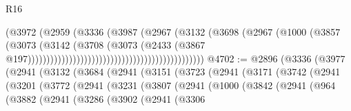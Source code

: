 \begin{lexlean}{R16}
\begin{coremodule}
                                                                  (@3972
                                                                    (@2959
                                                                      (@3336
                                                                        (@3987
                                                                          (@2967
                                                                            (@3132
                                                                              (@3698
                                                                                (@2967
                                                                                  (@1000
                                                                                    (@3857
                                                                                      (@3073
                                                                                        (@3142
                                                                                          (@3708
                                                                                            (@3073
                                                                                              (@2433
                                                                                                (@3867
                                                                                                  @197)))))))))))))))))))))))))))))))))))))))))))))))
@4702 := @2896
    (@3336
      (@3977
        (@2941
          (@3132
            (@3684
              (@2941
                (@3151
                  (@3723
                    (@2941
                      (@3171
                        (@3742
                          (@2941
                            (@3201
                              (@3772
                                (@2941
                                  (@3231
                                    (@3807
                                      (@2941
                                        (@1000
                                          (@3842
                                            (@2941
                                              (@964
                                                (@3882
                                                  (@2941
                                                    (@3286
                                                      (@3902
                                                        (@2941
                                                          (@3306

\end{coremodule}
\end{lexlean}
